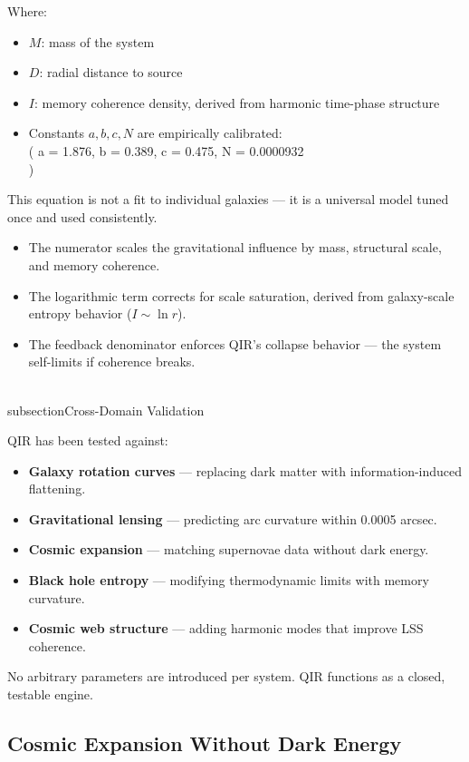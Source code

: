 \documentclass[11pt]{article}
\begin{document}
Where:
\begin{itemize}
  \item \(M\): mass of the system
  \item \(D\): radial distance to source
  \item \(I\): memory coherence density, derived from harmonic time-phase structure
  \item Constants \(a, b, c, N\) are empirically calibrated: \\( a = 1.876, b = 0.389, c = 0.475, N = 0.0000932 \\)
\end{itemize}

This equation is not a fit to individual galaxies — it is a universal model tuned once and used consistently.

\begin{itemize}
  \item The numerator scales the gravitational influence by mass, structural scale, and memory coherence.
  \item The logarithmic term corrects for scale saturation, derived from galaxy-scale entropy behavior (\(I \sim \ln r\)).
  \item The feedback denominator enforces QIR’s collapse behavior — the system self-limits if coherence breaks.
\end{itemize}

\\subsection{Cross-Domain Validation}

QIR has been tested against:

\begin{itemize}
  \item \textbf{Galaxy rotation curves} — replacing dark matter with information-induced flattening.
  \item \textbf{Gravitational lensing} — predicting arc curvature within 0.0005 arcsec.
  \item \textbf{Cosmic expansion} — matching supernovae data without dark energy.
  \item \textbf{Black hole entropy} — modifying thermodynamic limits with memory curvature.
  \item \textbf{Cosmic web structure} — adding harmonic modes that improve LSS coherence.
\end{itemize}

No arbitrary parameters are introduced per system. QIR functions as a closed, testable engine.

\subsection{Cosmic Expansion Without Dark Energy}
\end{document}
